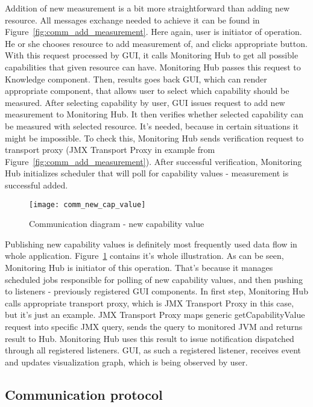 Addition of new measurement is a bit more straightforward than adding new resource. All messages exchange needed to
achieve it can be found in Figure~\ref{fig:comm_add_measurement}. Here again, user is initiator of operation. He or she
chooses resource to add measurement of, and clicks appropriate button. With this request processed by GUI, it calls
Monitoring Hub to get all possible capabilities that given resource can have. Monitoring Hub passes this request to
Knowledge component. Then, results goes back GUI, which can render appropriate component, that allows user to select
which capability should be measured. After selecting capability by user, GUI issues request to add new measurement to
Monitoring Hub. It then verifies whether selected capability can be measured with selected resource. It's needed,
because in certain situations it might be impossible. To check this, Monitoring Hub sends verification request to
transport proxy (JMX Transport Proxy in example from Figure~\ref{fig:comm_add_measurement}). After successful
verification, Monitoring Hub initializes scheduler that will poll for capability values - measurement is successful
added.


\begin{figure}[h]
  \centering
  \texttt{[image: comm\_new\_cap\_value]}
  \caption{Communication diagram - new capability value}
  \label{fig:comm_new_cap_value}
\end{figure}

Publishing new capability values is definitely most frequently used data flow in whole application.
Figure~\ref{fig:comm_new_cap_value} contains it's whole illustration. As can be seen, Monitoring Hub is initiator of
this operation. That's because it manages scheduled jobs responsible for polling of new capability values, and then
pushing to listeners - previously registered GUI components. In first step, Monitoring Hub calls appropriate transport
proxy, which is JMX Transport Proxy in this case, but it's just an example. JMX Transport Proxy maps generic
getCapabilityValue request into specific JMX query, sends the query to monitored JVM and returns result to Hub.
Monitoring Hub uses this result to issue notification dispatched through all registered listeners. GUI, as such a
registered listener, receives event and updates visualization graph, which is being observed by user.


\subsection{Communication protocol}


